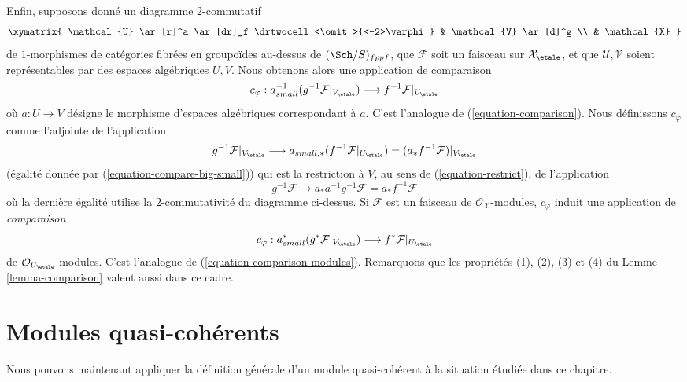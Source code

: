 \medskip\noindent
Enfin, supposons donné un diagramme $2$-commutatif
$$
\xymatrix{
\mathcal{U} \ar[r]^a \ar[dr]_f \drtwocell<\omit>{<-2>\varphi} &
\mathcal{V} \ar[d]^g \\
& \mathcal{X}
}
$$
de $1$-morphismes de catégories fibrées en groupoïdes au-dessus de $(\Sch/S)_{fppf}$,
que $\mathcal{F}$ soit un faisceau sur $\mathcal{X}_\etale$,
et que $\mathcal{U}, \mathcal{V}$ soient représentables par des espaces algébriques
$U, V$. Nous obtenons alors une application de comparaison
\begin{equation}
\label{equation-comparison-algebraic-spaces}
c_\varphi : a_{small}^{-1}(g^{-1}\mathcal{F}|_{V_\etale})
\longrightarrow
f^{-1}\mathcal{F}|_{U_\etale}
\end{equation}
où $a : U \to V$ désigne le morphisme d'espaces algébriques correspondant
à $a$. C'est l'analogue de (\ref{equation-comparison}). Nous définissons
$c_\varphi$ comme l'adjointe de l'application
$$
g^{-1}\mathcal{F}|_{V_\etale}
\longrightarrow
a_{small, *}(f^{-1}\mathcal{F}|_{U_\etale}) =
(a_*f^{-1}\mathcal{F})|_{V_\etale}
$$
(égalité donnée par (\ref{equation-compare-big-small}))
qui est la restriction à $V$, au sens de (\ref{equation-restrict}), de l'application
$$
g^{-1}\mathcal{F} \to a_*a^{-1}g^{-1}\mathcal{F} = a_*f^{-1}\mathcal{F}
$$
où la dernière égalité utilise la $2$-commutativité du diagramme ci-dessus.
Si $\mathcal{F}$ est un faisceau de $\mathcal{O}_\mathcal{X}$-modules,
$c_\varphi$ induit une application de {\it comparaison}
\begin{equation}
\label{equation-comparison-algebraic-spaces-modules}
c_\varphi : a_{small}^*(g^*\mathcal{F}|_{V_\etale})
\longrightarrow
f^*\mathcal{F}|_{U_\etale}
\end{equation}
de $\mathcal{O}_{U_\etale}$-modules. C'est l'analogue de
(\ref{equation-comparison-modules}).
Remarquons que les propriétés (1), (2), (3) et (4) du
Lemme \ref{lemma-comparison}
valent aussi dans ce cadre.












\section{Modules quasi-cohérents}
\label{section-quasi-coherent}

\noindent
Nous pouvons maintenant appliquer la définition générale d'un module
quasi-cohérent à la situation étudiée dans ce chapitre.

